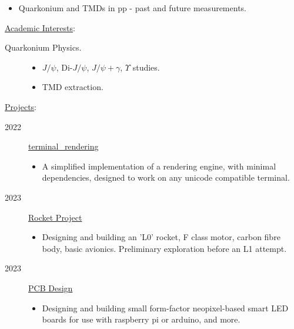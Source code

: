 \documentclass[10pt]{article}
\begin{document}
\begin{bgbox}[height=\paperheight,colback=gray,width=0.7\textwidth]
\begin{description}
\begin{description}
            \begin{itemize}
                \item Quarkonium and TMDs in pp - past and future measurements. 
            \end{itemize}
        \end{description}
        \item \underline{Academic Interests}:
        \begin{description}
            \item[Quarkonium Physics.]\; 
            \begin{itemize}
                \item $J/\psi$, Di-$J/\psi$, $J/\psi+\gamma$, $\Upsilon$ studies.
                \item TMD extraction.
            \end{itemize}
        \end{description}
        \item \underline{Projects}:
        \begin{description}
            \item[2022] \href{https://github.com/aihphysics/terminal_rendering}{terminal\_rendering}
            \begin{itemize}
                \item A simplified implementation of a rendering engine, with minimal dependencies, designed to work on any unicode compatible terminal.
            \end{itemize}
            \item[2023] \href{https://github.com/aihphysics/L0}{Rocket Project}
            \begin{itemize}
                \item Designing and building an 'L0' rocket, F class motor, carbon fibre body, basic avionics. Preliminary exploration before an L1 attempt.
            \end{itemize}
            \item[2023] \href{https://github.com/aihphysics/mini_neo_led_matrix}{PCB Design}
            \begin{itemize}
                \item Designing and building small form-factor neopixel-based smart LED boards for use with raspberry pi or arduino, and more.
            \end{itemize}

\end{description}
\end{description}
\end{bgbox}
\end{document}
